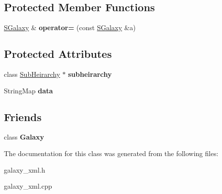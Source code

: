 \subsection*{Protected Member Functions}
\begin{DoxyCompactItemize}
\item 
\hyperlink{classGalaxyXML_1_1SGalaxy}{S\+Galaxy} \& {\bfseries operator=} (const \hyperlink{classGalaxyXML_1_1SGalaxy}{S\+Galaxy} \&a)\hypertarget{classGalaxyXML_1_1SGalaxy_acf09e58104f1d589a38d32e6cf1c5ec2}{}\label{classGalaxyXML_1_1SGalaxy_acf09e58104f1d589a38d32e6cf1c5ec2}

\end{DoxyCompactItemize}
\subsection*{Protected Attributes}
\begin{DoxyCompactItemize}
\item 
class \hyperlink{classGalaxyXML_1_1SubHeirarchy}{Sub\+Heirarchy} $\ast$ {\bfseries subheirarchy}\hypertarget{classGalaxyXML_1_1SGalaxy_a677f23ba13edeacf87bbf4fc11503dc5}{}\label{classGalaxyXML_1_1SGalaxy_a677f23ba13edeacf87bbf4fc11503dc5}

\item 
String\+Map {\bfseries data}\hypertarget{classGalaxyXML_1_1SGalaxy_ae9a4911ec6f53fe7888224828f7137d0}{}\label{classGalaxyXML_1_1SGalaxy_ae9a4911ec6f53fe7888224828f7137d0}

\end{DoxyCompactItemize}
\subsection*{Friends}
\begin{DoxyCompactItemize}
\item 
class {\bfseries Galaxy}\hypertarget{classGalaxyXML_1_1SGalaxy_a2c4c66e3124e82df3ee97b475b281940}{}\label{classGalaxyXML_1_1SGalaxy_a2c4c66e3124e82df3ee97b475b281940}

\end{DoxyCompactItemize}


The documentation for this class was generated from the following files\+:\begin{DoxyCompactItemize}
\item 
galaxy\+\_\+xml.\+h\item 
galaxy\+\_\+xml.\+cpp\end{DoxyCompactItemize}
